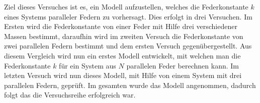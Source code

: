 \label{sec:zusammenfassung}


Ziel dieses Versuches ist es, ein Modell aufzustellen, welches die Federkonstante $k$ eines Systems paralleler Federn zu vorhersagt. Dies erfolgt in drei Versuchen. Im Ersten wird die Federkonstante von einer Feder mit Hilfe drei verschiedener Massen bestimmt, daraufhin wird im zweiten Versuch die Federkonstante von zwei parallelen Federn bestimmt und dem ersten Versuch gegenübergestellt. Aus diesem Vergleich wird nun ein erstes Modell entwickelt, mit welchen man die Federkonstante $k$ für ein System aus $N$ parallelen Feder berechnen kann. Im letzten Versuch wird nun dieses Modell, mit Hilfe von einem System mit drei parallelen Federn, geprüft. Im gesamten wurde das Modell angenommen, dadurch folgt das die Versuchsreihe erfolgreich war.
